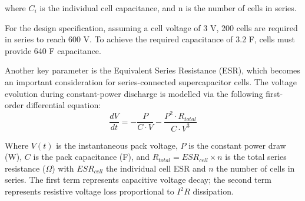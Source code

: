 \documentclass[11pt, a4paper]{report}
\numberwithin{equation}{section}
\begin{document}
\begin{refsection}
where \(C_i\) is the individual cell capacitance, and n is the number of cells in series.

For the design specification, assuming a cell voltage of 3 V, 200 cells are required in series to reach 600 V. To achieve the required capacitance of 3.2 F, cells must provide 640 F capacitance.

Another key parameter is the Equivalent Series Resistance (ESR), which becomes an important consideration for series-connected supercapacitor cells. The voltage evolution during constant-power discharge is modelled via the following first-order differential equation:
\begingroup
\setlength{\abovedisplayskip}{8pt plus 0pt minus 0pt}
\setlength{\belowdisplayskip}{8pt plus 0pt minus 0pt}
\setlength{\abovedisplayshortskip}{8pt plus 0pt minus 0pt}
\setlength{\belowdisplayshortskip}{8pt plus 0pt minus 0pt}
\begin{equation}
\frac{dV}{dt} = -\frac{P}{C \cdot V} - \frac{P^2 \cdot R_{total}}{C \cdot V^3}
\label{eq:pack_voltage_dynamics}
\end{equation}
\endgroup

Where $V(t)$ is the instantaneous pack voltage, $P$ is the constant power draw (W), $C$ is the pack capacitance (F), and $R_{total} = ESR_{cell} \times n$ is the total series resistance (\(\Omega\)) with $ESR_{cell}$ the individual cell ESR and $n$ the number of cells in series. The first term represents capacitive voltage decay; the second term represents resistive voltage loss proportional to $I^2 R$ dissipation.


\end{refsection}
\end{document}
